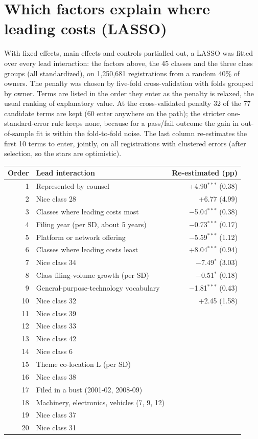 \section*{Which factors explain where leading costs (LASSO)}
With fixed effects, main effects and controls partialled out, a LASSO was fitted over every lead interaction: the factors above, the 45 classes and the three class groups (all standardized), on 1,250,681 registrations from a random 40\% of owners. The penalty was chosen by five-fold cross-validation with folds grouped by owner. Terms are listed in the order they enter as the penalty is relaxed, the usual ranking of explanatory value. At the cross-validated penalty 32 of the 77 candidate terms are kept (60 enter anywhere on the path); the stricter one-standard-error rule keeps none, because for a pass/fail outcome the gain in out-of-sample fit is within the fold-to-fold noise. The last column re-estimates the first 10 terms to enter, jointly, on all registrations with clustered errors (after selection, so the stars are optimistic).

{\small\begin{longtable}{r>{\raggedright\arraybackslash}p{8.2cm}r}
\toprule Order & Lead interaction & Re-estimated (pp) \\ \midrule \endhead
1 & Represented by counsel & +4.90$^{***}$ (0.38) \\
2 & Nice class 28 & +6.77 (4.99) \\
3 & Classes where leading costs most & $-$5.04$^{***}$ (0.38) \\
4 & Filing year (per SD, about 5 years) & $-$0.73$^{***}$ (0.17) \\
5 & Platform or network offering & $-$5.59$^{***}$ (1.12) \\
6 & Classes where leading costs least & +8.04$^{***}$ (0.94) \\
7 & Nice class 34 & $-$7.49$^{*}$ (3.03) \\
8 & Class filing-volume growth (per SD) & $-$0.51$^{*}$ (0.18) \\
9 & General-purpose-technology vocabulary & $-$1.81$^{***}$ (0.43) \\
10 & Nice class 32 & +2.45 (1.58) \\
11 & Nice class 39 &  \\
12 & Nice class 33 &  \\
13 & Nice class 42 &  \\
14 & Nice class 6 &  \\
15 & Theme co-location L (per SD) &  \\
16 & Nice class 38 &  \\
17 & Filed in a bust (2001-02, 2008-09) &  \\
18 & Machinery, electronics, vehicles (7, 9, 12) &  \\
19 & Nice class 37 &  \\
20 & Nice class 31 &  \\
\bottomrule\end{longtable}}
